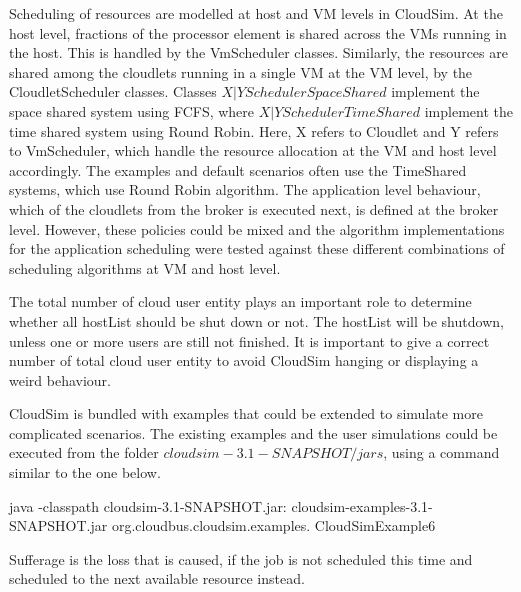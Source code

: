 \documentclass[times, 10pt,twocolumn]{article}
\begin{document}
Scheduling of resources are modelled at host and VM levels in CloudSim. At the host level, fractions of the processor element is shared across the VMs running in the host. This is handled by the VmScheduler classes. Similarly, the resources are shared among the cloudlets running in a single VM at the VM level, by the CloudletScheduler classes. Classes ${X|Y}SchedulerSpaceShared$ implement the space shared system using FCFS, where ${X|Y}SchedulerTimeShared$ implement the time shared system using Round Robin. Here, X refers to Cloudlet and Y refers to VmScheduler, which handle the resource allocation at the VM and host level accordingly. The examples and default scenarios often use the TimeShared systems, which use Round Robin algorithm. The application level behaviour, which of the cloudlets from the broker is executed next, is defined at the broker level. However, these policies could be mixed and the algorithm implementations for the application scheduling were tested against these different combinations of scheduling algorithms at VM and host level.

The total number of cloud user entity plays an important role to determine whether all hostList should be shut down or not. The hostList will be shutdown, unless one or more users are still not finished. It is important to give a correct number of total cloud user entity to avoid CloudSim hanging or displaying a weird behaviour.



CloudSim is bundled with examples that could be extended to simulate more complicated scenarios. The existing examples and the user simulations could be executed from the folder $cloudsim-3.1-SNAPSHOT/jars$, using a command similar to the one below.
\begin{verbatimtab}
java -classpath
    cloudsim-3.1-SNAPSHOT.jar:
    cloudsim-examples-3.1-SNAPSHOT.jar 
    org.cloudbus.cloudsim.examples.
    CloudSimExample6
\end{verbatimtab}

Sufferage is the loss that is caused, if the job is not scheduled this time and scheduled to the next available resource instead.
\end{document}
